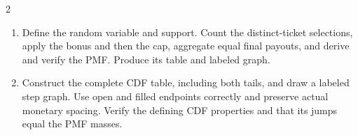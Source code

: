 \begin{multicols*}{2}
\begin{enumerate}[label=(\alph*)]
\item Define the random variable and support. Count the distinct-ticket selections, apply the bonus and then the cap, aggregate equal final payouts, and derive and verify the PMF. Produce its table and labeled graph. 
\item Construct the complete CDF table, including both tails, and draw a labeled step graph. Use open and filled endpoints correctly and preserve actual monetary spacing. Verify the defining CDF properties and that its jumps equal the PMF masses. 
\end{enumerate}
\end{multicols*}

